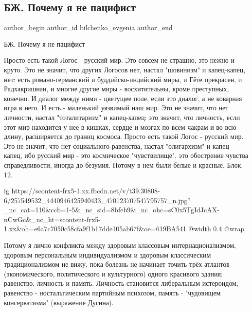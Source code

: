  
 
 
 
 
 
\subsection{БЖ. Почему я не пацифист}
\label{sec:14_11_2021.fb.bilchenko_evgenia.1.pochemu_ja_ne_pacifist}
 
\ifcmt
 author_begin
   author_id bilchenko_evgenia
 author_end
\fi

БЖ. Почему я не пацифист

Просто есть такой Логос - русский мир. Это совсем не страшно, это нежно и
круто. Это не значит, что других Логосов нет, настал "шовинизм" и капец-капец,
нет: есть романо-германский и буддийско-индийский миры, и Гёте прекрасен, и
Радхакришнан, и многие другие миры - восхитительны, кроме преступных, конечно.
И диалог между ними - цветущее поле, если это диалог, а не коварная игра в
него. И есть - маленький уязвимый наш мир. Это не значит, что нет личности,
настал "тоталитаризм" и капец-капец: это значит, что личность, если этот мир
находится у нее в кишках, сердце и мозгах по всем чакрам и во всю длину,
расширяется до границ космоса. Просто есть такой Логос - русский мир. Это не
значит, что нет социального равенства, настал "олигархизм" и капец-капец, ибо
русский мир - это космическое "чувствилище", это обострение чувства
справедливости, иногда до безумия. Потому в нем были белые и красные, Блок, 12.

\ifcmt
  ig https://scontent-frx5-1.xx.fbcdn.net/v/t39.30808-6/257549532_4440946425940433_470123707547795757_n.jpg?_nc_cat=110&ccb=1-5&_nc_sid=8bfeb9&_nc_ohc=sC0x5TgIdJcAX-nCwGc&_nc_ht=scontent-frx5-1.xx&oh=e6a7c7050c58cfa9f1b17dde105ab67f&oe=619BA541
  @width 0.4
  @wrap 
\fi

Потому я лично конфликта между здоровым классовым интернационализмом, здоровым
персональным индивидуализмом и здоровым классическим традиционализмом не вижу,
пока болезнь не начинает точить трёх атлантов (экономического, политического и
культурного) одного красивого здания: равенство, личность и память. Личность
становится либеральным истероидом, равенство - ностальгическим партийным
психозом, память - "чудовищем консерватизма" (выражение Дугина).

